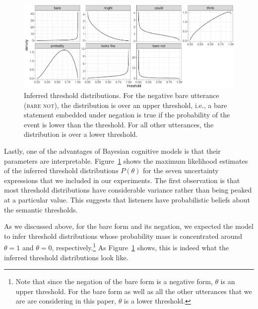 \documentclass[man, floatsintext]{apa6}
\begin{document}
\begin{figure}[th!]
\includegraphics[width=\textwidth]{plots/threshold-distributions-prior.pdf}
\caption{Inferred threshold distributions. For the negative bare utterance (\textsc{bare not}), the distribution is over an upper threshold, i.e., a bare statement embedded under negation is true if the probability of the event is lower than the threshold. For all other utterances, the distribution is over a lower threshold.
\label{fig:threshold-distributions}}
\end{figure}

Lastly, one of the advantages of Bayesian cognitive models is that their parameters are interpretable. Figure~\ref{fig:threshold-distributions} shows the 
maximum likelihood estimates of the inferred threshold distributions $P(\theta)$ for the seven uncertainty expressions that we included in our experiments.
The first observation is that most threshold distributions have considerable variance rather than being peaked at a particular value. This suggests that
listeners have probabilistic beliefs about the semantic thresholds.

As we discussed above, for the bare form and its negation, we expected the model to infer threshold distributions whose probability mass is concentrated 
around $\theta=1$ and $\theta=0$, respectively.\footnote{Note that since the negation of the bare form is a negative form, $\theta$ is an upper threshold. For the bare form as well as
all the other utterances that we are are considering in this paper, $\theta$ is a lower threshold.} As  Figure~\ref{fig:threshold-distributions} shows, this is indeed what
the inferred threshold distributions look like. 
\end{document}

